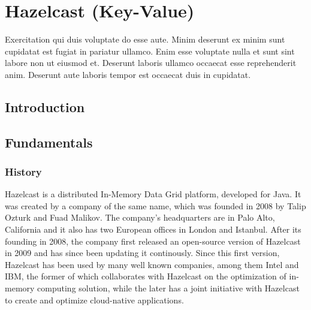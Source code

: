 
\chapter{Hazelcast (Key-Value)} \label{ch:hazelcast}

Exercitation qui duis voluptate do esse aute. Minim deserunt ex minim sunt cupidatat est fugiat in pariatur ullamco. Enim esse voluptate nulla et sunt sint labore non ut eiusmod et. Deserunt laboris ullamco occaecat esse reprehenderit anim. Deserunt aute laboris tempor est occaecat duis in cupidatat.

\section{Introduction} \label{sec:introductionHazelcast}

\section{Fundamentals} \label{sec:fundamentalsHazelcast}
\subsection{History} \label{subsec:historyHazelcast}
Hazelcast is a distributed In-Memory Data Grid platform, developed for Java. It was created by a company of the same name, 
which was founded in 2008 by Talip Ozturk and Fuad Malikov. \cite{DatabaseofDatabases.11032023} The company's headquarters are 
in Palo Alto, California and it also has two European offices in London and Istanbul. \cite{HazelcastContact.03112022} \newline
After its founding in 2008, the company first released an open-source version of Hazelcast in 2009 and has since been updating it 
continously. \cite{DatabaseofDatabases.11032023} Since this first version, Hazelcast has been used by many well known companies, 
among them Intel and IBM, the former of which collaborates with Hazelcast on the optimization of in-memory computing solution, while 
the later has a joint initiative with Hazelcast to create and optimize cloud-native applications. \cite{HazelcastPartners.270122}
